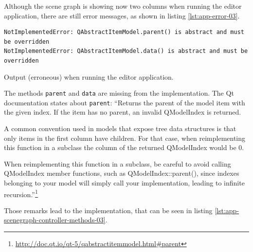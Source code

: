 \documentclass[10pt, openright, notitlepage]{scrreprt}
\begin{document}
Although the scene graph is showing now two columns when running the editor
application, there are still error messages, as shown in listing \ref{lst:app-error-03}.

\begin{listing}[H]
\begin{verbatim}
NotImplementedError: QAbstractItemModel.parent() is abstract and must be overridden
NotImplementedError: QAbstractItemModel.data() is abstract and must be overridden
\end{verbatim}
\caption{\label{lst:app-error-03}
Output (erroneous) when running the editor application.}
\end{listing}

The methods \texttt{parent} and \texttt{data} are missing from the
implementation. The Qt documentation states about \texttt{parent}:
``Returns the parent of the model item with the given index. If the item has no
parent, an invalid QModelIndex is returned.

A common convention used in models that expose tree data structures is that only
items in the first column have children. For that case, when reimplementing this
function in a subclass the column of the returned QModelIndex would be 0.

When reimplementing this function in a subclass, be careful to avoid calling
QModelIndex member functions, such as QModelIndex::parent(), since indexes
belonging to your model will simply call your implementation, leading to
infinite
recursion.''\footnote{\url{http://doc.qt.io/qt-5/qabstractitemmodel.html\#parent}}

Those remarks lead to the implementation, that can be seen in listing
\ref{lst:app-scenegraph-controller-methods-03}.
\end{document}
